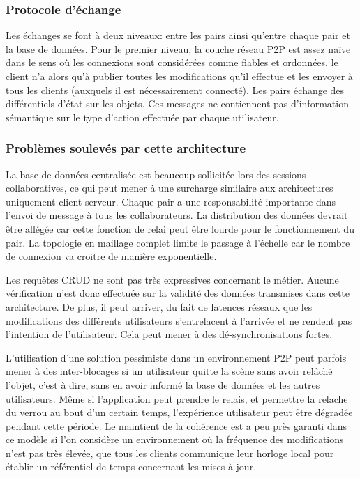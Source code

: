 \subsubsection{Protocole d'échange}
Les échanges se font à deux niveaux: entre les pairs ainsi qu'entre chaque pair et 
la base de données. Pour le premier niveau, la couche réseau \gls{P2P} est assez 
naïve dans le sens où les connexions sont considérées comme fiables et 
ordonnées, le client n'a alors qu'à publier toutes les modifications qu'il effectue et 
les envoyer à tous les clients (auxquels il est nécessairement connecté).
Les pairs échange des différentiels d'état sur les objets. Ces messages ne 
contiennent pas d'information sémantique sur le type d'action effectuée par chaque 
utilisateur. 
\subsubsection{Problèmes soulevés par cette architecture}

La base de données centralisée est beaucoup sollicitée lors des sessions 
collaboratives, ce qui peut mener à une surcharge similaire aux architectures 
uniquement client serveur. 
Chaque pair a une responsabilité importante dans l'envoi de message à tous les 
collaborateurs. La distribution des données devrait être allégée car cette fonction 
de relai peut être lourde pour le fonctionnement du pair. 
La topologie en maillage complet limite le passage à l'échelle car le nombre de 
connexion va croitre de manière exponentielle. 

Les requêtes \gls{CRUD} ne sont pas très expressives concernant le métier. 
Aucune vérification n'est donc effectuée sur la validité des données transmises 
dans cette architecture. De plus, il peut arriver, du fait de latences réseaux que les 
modifications des différents utilisateurs s'entrelacent à l'arrivée et ne rendent pas 
l'intention de l'utilisateur. Cela peut mener à des dé-synchronisations fortes.

L'utilisation d'une solution pessimiste dans un environnement \gls{P2P} peut 
parfois mener à des inter-blocages si un utilisateur quitte la scène sans avoir 
relâché l'objet, c'est à dire, sans en avoir informé la base de données et les autres 
utilisateurs. Même si l'application peut prendre le relais, et permettre la relache du 
verrou au bout d'un certain temps, l'expérience utilisateur peut être dégradée 
pendant cette période.
Le maintient de la cohérence est a peu près garanti dans ce modèle si l'on 
considère un environnement où la fréquence des modifications n'est pas très 
élevée, que tous les clients communique leur horloge local pour établir un 
référentiel de temps concernant les mises à jour. 

